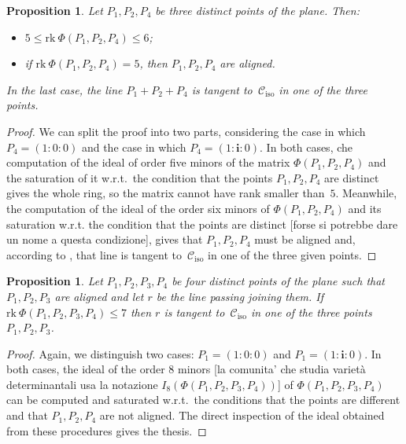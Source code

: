 \documentclass[11pt, a4paper, reqno, captions=tableheading,bibliography=totoc]{scrartcl}
\theoremstyle{plain}
\newtheorem{prop}[lemma]{Proposition}
\theoremstyle{definition}
\newcommand{\iso}{\mathcal{C}_{\mathrm{iso}}}
\newcommand{\iii}{\textbf{i}}
\newcommand{\blue}[1]{{\color{blue}  [#1]}}
\begin{document}
\begin{prop}
\label{manca il riferimento su ancillary    non e': condition_rank_aligned}
Let $P_1, P_2, P_4$ be three distinct points of the plane. Then:
\begin{itemize}
\item $5 \leq \text{rk}\ \Phi(P_1, P_2, P_4) \leq 6$;
\item if
$\text{rk}\ \Phi(P_1, P_2, P_4) = 5$, then $P_1, P_2, P_4$
 are aligned.
\end{itemize}
In the last case, the line $P_1+P_2+P_4$ is tangent to~$\iso$
in one of the three points.
\end{prop}
\begin{proof}
We can split the proof into two parts, considering the case in
which $P_4 = (1: 0: 0)$ and the case in which $P_4 = (1: \iii: 0)$.
In both cases, che computation of the ideal of order five minors of the matrix
$\Phi(P_1, P_2, P_4)$ and the saturation of it w.r.t.\ the condition
that the points $P_1, P_2, P_4$ are distinct gives the whole ring, so
the matrix cannot have rank smaller than~$5$. Meanwhile, the computation
of the ideal of the order six minors of $\Phi(P_1, P_2, P_4)$ and its
saturation w.r.t. the condition that the points are distinct \blue{forse si potrebbe dare un nome a questa condizione}, gives that
$P_1, P_2, P_4$ must be aligned and, according to ,
that line is tangent to~$\iso$ in one of the three given points.
\end{proof}


\begin{prop}
\label{prop:condition3+1}
Let $P_1, P_2, P_3, P_4$ be four distinct points of the plane such that
$P_1, P_2, P_3$ are aligned and let $r$
be the line passing joining them. If
$\text{rk}\ \Phi(P_1, P_2, P_3, P_4) \leq 7$ then $r$ is tangent to~$\iso$ in one of the three points $P_1, P_2, P_3$.
\end{prop}
\begin{proof}
Again, we distinguish two cases: $P_1 = (1: 0: 0)$ and
$P_1 = (1: \iii: 0)$. In both cases, the ideal of the order $8$
minors \blue {la comunita' che studia varietà determinantali usa la notazione $I_8(\Phi(P_1, P_2, P_3, P_4))$} of $\Phi(P_1, P_2, P_3, P_4)$ can be computed and saturated
w.r.t.\ the conditions that the points are different and that
$P_1, P_2, P_4$ are not aligned.
The direct inspection of the ideal obtained from these procedures gives the thesis.
\end{proof}
\end{document}
